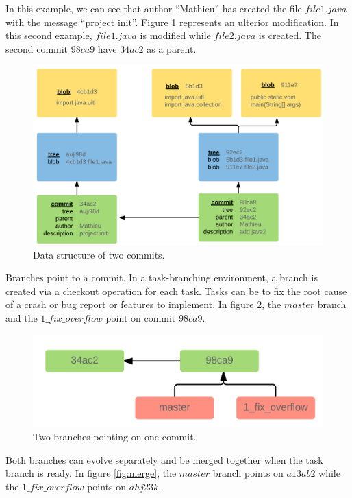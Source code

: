 In this example, we can see that author ``Mathieu'' has created the file $file1.java$ with the message ``project init''.
Figure \ref{fig:two-commits} represents an ulterior modification.
In this second example, $file1. java$ is modified while $file2.java$ is created.
The second commit $98ca9$ have $34ac2$ as a parent.

\begin{figure}[h!]
  \centering
    \includegraphics[scale=0.25]{media/branching.png}
    \caption{Data structure of two commits.
    \label{fig:two-commits}}
\end{figure}

Branches point to a commit.
In a task-branching environment, a branch is created via a checkout operation for each task.
Tasks can be to fix the root cause of a crash or bug report or features to implement.
In figure \ref{fig:two-branches}, the $master$ branch and the $1\_fix\_overflow$ point on commit $98ca9$.

\begin{figure}[h!]
  \centering
    \includegraphics[scale=0.25]{media/2branches.png}
    \caption{Two branches pointing on one commit.
    \label{fig:two-branches}}
\end{figure}

Both branches can evolve separately and be merged together when the task branch is ready.
In figure \ref{fig:merge}, the $master$ branch points on $a13ab2$ while the $1\_fix\_overflow$ points on $ahj23k$.

